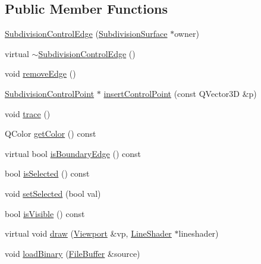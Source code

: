 \subsection*{Public Member Functions}
\begin{DoxyCompactItemize}
\item 
\hyperlink{classShipCAD_1_1SubdivisionControlEdge_aca48edfc1bb45a645708aecc8c8c3e04}{Subdivision\+Control\+Edge} (\hyperlink{classShipCAD_1_1SubdivisionSurface}{Subdivision\+Surface} $\ast$owner)
\item 
virtual \hyperlink{classShipCAD_1_1SubdivisionControlEdge_a34c09fb23ec57183f23f24041e74e455}{$\sim$\+Subdivision\+Control\+Edge} ()
\item 
void \hyperlink{classShipCAD_1_1SubdivisionControlEdge_abe82306f1ec030a157aa63cffdc74cfc}{remove\+Edge} ()
\item 
\hyperlink{classShipCAD_1_1SubdivisionControlPoint}{Subdivision\+Control\+Point} $\ast$ \hyperlink{classShipCAD_1_1SubdivisionControlEdge_a4839a04d67e4240b570fd23be711bc10}{insert\+Control\+Point} (const Q\+Vector3D \&p)
\item 
void \hyperlink{classShipCAD_1_1SubdivisionControlEdge_a07c67ddff486dc5e4ad830f549b32099}{trace} ()
\item 
Q\+Color \hyperlink{classShipCAD_1_1SubdivisionControlEdge_a03b64928521eb0b21145986fc76b1d5b}{get\+Color} () const 
\item 
virtual bool \hyperlink{classShipCAD_1_1SubdivisionControlEdge_addb133d29e0b48e436eb6710bb91d6bf}{is\+Boundary\+Edge} () const 
\item 
bool \hyperlink{classShipCAD_1_1SubdivisionControlEdge_ada6cf5e0cc2a27fede7eee3206940c6f}{is\+Selected} () const 
\item 
void \hyperlink{classShipCAD_1_1SubdivisionControlEdge_ae247e08eec97952d1835df03c8269829}{set\+Selected} (bool val)
\item 
bool \hyperlink{classShipCAD_1_1SubdivisionControlEdge_abdf3cc3f37064e47096fbda4c190fcd3}{is\+Visible} () const 
\item 
virtual void \hyperlink{classShipCAD_1_1SubdivisionControlEdge_a6b86017a5ea7fe487f6017071406e8c4}{draw} (\hyperlink{classShipCAD_1_1Viewport}{Viewport} \&vp, \hyperlink{classShipCAD_1_1LineShader}{Line\+Shader} $\ast$lineshader)
\item 
void \hyperlink{classShipCAD_1_1SubdivisionControlEdge_a0f48c4ce176a5de42e0a7c741aa129f5}{load\+Binary} (\hyperlink{classShipCAD_1_1FileBuffer}{File\+Buffer} \&source)
\item 

\end{DoxyCompactItemize}

